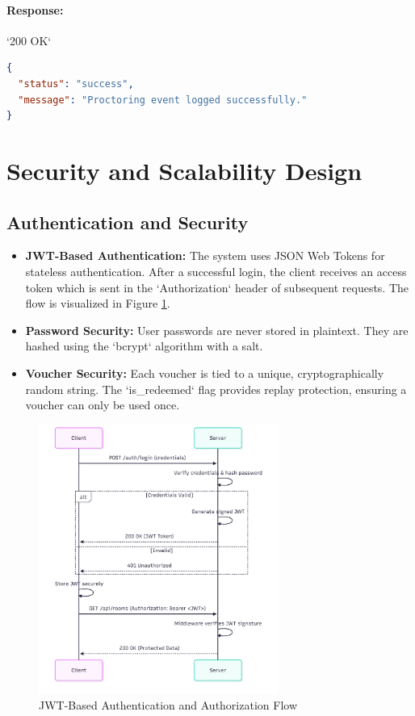 \paragraph{Response:} `200 OK`
\begin{lstlisting}[language=JSON]
{
  "status": "success",
  "message": "Proctoring event logged successfully."
}
\end{lstlisting}

\section{Security and Scalability Design}
\label{sec:arch-security-scalability}

\subsection{Authentication and Security}
\begin{itemize}
    \item \textbf{JWT-Based Authentication:} The system uses JSON Web Tokens for stateless authentication. After a successful login, the client receives an access token which is sent in the `Authorization` header of subsequent requests. The flow is visualized in Figure \ref{fig:jwt-flow}.
    \item \textbf{Password Security:} User passwords are never stored in plaintext. They are hashed using the `bcrypt` algorithm with a salt.
    \item \textbf{Voucher Security:} Each voucher is tied to a unique, cryptographically random string. The `is_redeemed` flag provides replay protection, ensuring a voucher can only be used once.
\end{itemize}

\begin{figure}[htbp]
\centering
\includegraphics[width=0.7\textwidth]{figures/jwt-flow.png}
\caption{JWT-Based Authentication and Authorization Flow}
\label{fig:jwt-flow}
\end{figure}

